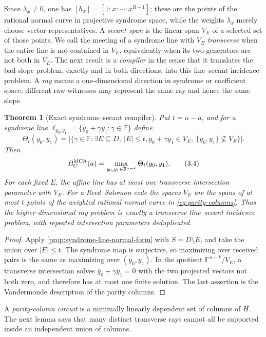 \documentclass[11pt,a4paper]{amsart}
\numberwithin{equation}{section}
\newtheorem{theorem}{Theorem}[section]
\theoremstyle{remark}
\newcommand{\F}{\mathbb F}
\newcommand{\abs}[1]{\lvert #1\rvert}
\begin{document}
Since \(\lambda_x\ne0\), one has
\([h_x]=[1:x:\cdots:x^{R-1}]\); these are the points of the rational
normal curve in projective syndrome space, while the weights
\(\lambda_x\) merely choose vector representatives.  A \emph{secant span} is the linear span
\(V_E\) of a selected set of those points.  We call the meeting of a
syndrome line with \(V_E\) \emph{transverse} when the entire line is not
contained in \(V_E\), equivalently when its two generators are not both in
\(V_E\).  The next result is a \emph{compiler} in the sense that it
translates the bad-slope problem, exactly and in both directions, into this
line--secant incidence problem.  A \emph{ray} means a one-dimensional
direction in syndrome or coefficient space; different raw witnesses may
represent the same ray and hence the same slope.

\begin{theorem}[Exact syndrome--secant compiler]
\label{thm:syndrome-secant-exact}
Put \(t=n-a\), and for a syndrome line
\(\ell_{y_0,y_1}=\{y_0+\gamma y_1:\gamma\in\F\}\) define
\[
 \Theta_t(y_0,y_1)=
 \abs{\{\gamma\in\F:\exists E\subseteq D,\ \abs E\le t,
 y_0+\gamma y_1\in V_E,
 \ \{y_0,y_1\}\not\subseteq V_E\}}.
 \tag{3.3}\label{eq:transverse-secant-count}
\]
Then
\[
 B_C^{\rm MCA}(a)=\max_{y_0,y_1\in\F^{n-k}}
                    \Theta_t(y_0,y_1).
 \tag{3.4}\label{eq:exact-secant-numerator}
\]
For each fixed \(E\), the affine line has at most one transverse
intersection parameter with \(V_E\).  For a Reed--Solomon code the
spaces \(V_E\) are the spans of at most \(t\) points of the weighted
rational normal curve in \eqref{eq:parity-columns}.  Thus the
higher-dimensional ray problem is exactly a transverse line--secant
incidence problem, with repeated intersection parameters deduplicated.
\end{theorem}

\begin{proof}
Apply \cref{prop:syndrome-line-normal-form} with \(S=D\setminus E\), and
take the union over \(\abs E\le t\).  The syndrome map is surjective, so
maximizing over received pairs is the same as maximizing over
\((y_0,y_1)\).  In the quotient \(\F^{n-k}/V_E\), a transverse
intersection solves
\(\overline y_0+\gamma\overline y_1=0\) with the two projected vectors
not both zero, and therefore has at most one finite solution.  The last
assertion is the Vandermonde description of the parity columns.
\end{proof}

A \emph{parity-column circuit} is a minimally linearly dependent set of
columns of \(H\).  The next lemma says that many distinct transverse rays
cannot all be supported inside an independent union of columns.
\end{document}
